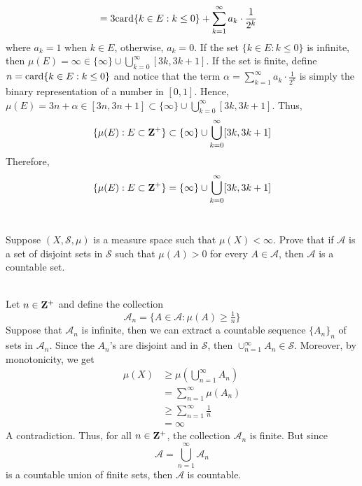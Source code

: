 \begin{solution}
\begin{align*}
        &= 3\text{card} \{k \in E : k\leq 0\} + \sum_{k=1}^{\infty}a_k \cdot \frac{1}{2^k}
    \end{align*}
    where $a_k = 1$ when $k \in E$, otherwise, $a_k = 0$. If the set $\{k \in E : k\leq 0\}$ is infinite, then $\mu(E) = \infty \in \{\infty\} \cup \bigcup_{k=0}^{\infty}[3k, 3k+1]$. If the set is finite, define $n = \text{card} \{k \in E : k\leq 0\}$ and notice that the term $\alpha = \sum_{k=1}^{\infty}a_k \cdot \frac{1}{2^k}$ is simply the binary representation of a number in $[0, 1]$. Hence, $\mu(E) = 3n + \alpha \in [3n, 3n+1] \subset \{\infty\} \cup \bigcup_{k=0}^{\infty}[3k, 3k+1]$. Thus,
    $$\{ \mu(E) : E \subset \mathbf{Z}^+\} \subset \{\infty\} \cup \bigcup_{k=0}^{\infty}[3k, 3k+1]$$
    Therefore, 
    $$\{ \mu(E) : E \subset \mathbf{Z}^+\} = \{\infty\} \cup \bigcup_{k=0}^{\infty}[3k, 3k+1]$$ \\
\end{solution}

\begin{exercise}
    Suppose $(X, \mathcal{S}, \mu)$ is a measure space such that $\mu(X) < \infty$. Prove that if $\mathcal{A}$ is a set of disjoint sets in $\mathcal{S}$ such that $\mu(A) > 0$ for every $A \in \mathcal{A}$, then $\mathcal{A}$ is a countable set. \\
\end{exercise}

\begin{solution}
    \\ Let $n \in \mathbf{Z}^+$ and define the collection
    $$\mathcal{A}_n = \{A \in \mathcal{A} : \mu(A) \geq \tfrac{1}{n}\}$$
    Suppose that $\mathcal{A}_n$ is infinite, then we can extract a countable sequence $\{A_n\}_n$ of sets in $\mathcal{A}_n$. Since the $A_n$'s are disjoint and in $\mathcal{S}$, then $\cup_{n=1}^{\infty}A_n \in \mathcal{S}$. Moreover, by monotonicity, we get
    \begin{align*}
        \mu(X) &\geq \mu \left(\bigcup_{n=1}^{\infty}A_n\right) \\
        &= \sum_{n=1}^{\infty}\mu(A_n) \\
        &\geq \sum_{n=1}^{\infty}\frac{1}{n} \\
        &= \infty
    \end{align*}
    A contradiction. Thus, for all $n \in \mathbf{Z}^+$, the collection $\mathcal{A}_n$ is finite. But since
    $$\mathcal{A} = \bigcup_{n=1}^{\infty}\mathcal{A}_n$$
    is a countable union of finite sets, then $\mathcal{A}$ is countable. \\
\end{solution}

